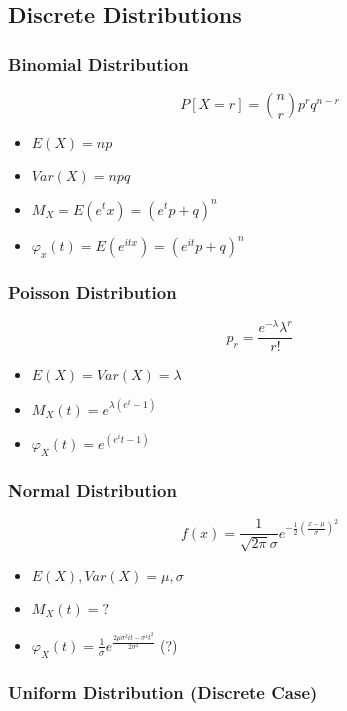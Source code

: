 \documentclass[12pt]{article}
\begin{document}
\subsection{Discrete Distributions}

\subsubsection{Binomial Distribution}

\[ P[X=r]= \binom{n}{r} p^r q^{n-r} \]

\begin{itemize}
    \item $E(X)= np$
    \item $Var(X)= npq$
    \item $M_X = E(e^tx) = (e^{t}p+q)^n$
    \item $\varphi_x(t) = E(e^{itx}) = (e^{it}p+q)^n$
\end{itemize}

\subsubsection{Poisson Distribution}
\[ p_r = \frac{e^{-\lambda} \lambda^r}{r!} \]
\begin{itemize}
    \item $E(X)= Var(X) = \lambda$
    \item $ M_X(t) = e^{\lambda (e^t -1) }$
    \item $ \varphi_X(t) = e^{(e^it -1)}$
\end{itemize}


\subsubsection{Normal Distribution}
\[  f(x) = \frac{1}{\sqrt{2\pi}\sigma} e^{-\frac{1}{2} \left(\frac{x-\mu}{\sigma}\right)^2}  \]
\begin{itemize}
    \item $E(X), Var(X) = \mu,\sigma$
    \item $M_X(t) = ?$
    \item $\varphi_X(t) = \frac{1}{\sigma}e^\frac{2\mu\sigma^2it-\sigma^4t^2}{2\sigma^2}$ \quad\quad\quad\quad (?)
\end{itemize}


\subsubsection{Uniform Distribution (Discrete Case)}
\end{document}
